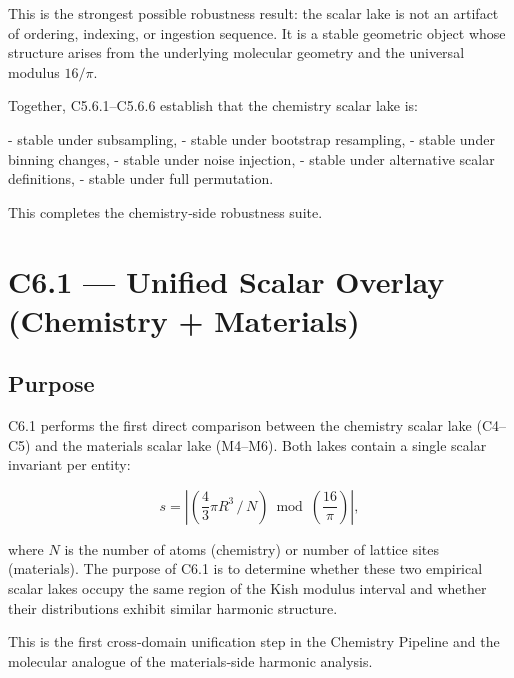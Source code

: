 \documentclass[11pt, letterpaper, openany]{book}
\begin{document}
This is the strongest possible robustness result: the scalar lake is not an
artifact of ordering, indexing, or ingestion sequence. It is a stable geometric
object whose structure arises from the underlying molecular geometry and the
universal modulus \(16/\pi\).

Together, C5.6.1–C5.6.6 establish that the chemistry scalar lake is:

- stable under subsampling,  
- stable under bootstrap resampling,  
- stable under binning changes,  
- stable under noise injection,  
- stable under alternative scalar definitions,  
- stable under full permutation.

This completes the chemistry‑side robustness suite.


\section{C6.1 — Unified Scalar Overlay (Chemistry + Materials)}

\subsection*{Purpose}
C6.1 performs the first direct comparison between the chemistry scalar lake
(C4–C5) and the materials scalar lake (M4–M6). Both lakes contain a single
scalar invariant per entity:



\[
s = \left| \left( \frac{4}{3}\pi R^3 \,/\, N \right)
      \bmod \left( \frac{16}{\pi} \right) \right|,
\]



where \(N\) is the number of atoms (chemistry) or number of lattice sites
(materials). The purpose of C6.1 is to determine whether these two empirical
scalar lakes occupy the same region of the Kish modulus interval and whether
their distributions exhibit similar harmonic structure.

This is the first cross‑domain unification step in the Chemistry Pipeline and
the molecular analogue of the materials‑side harmonic analysis.
\end{document}
